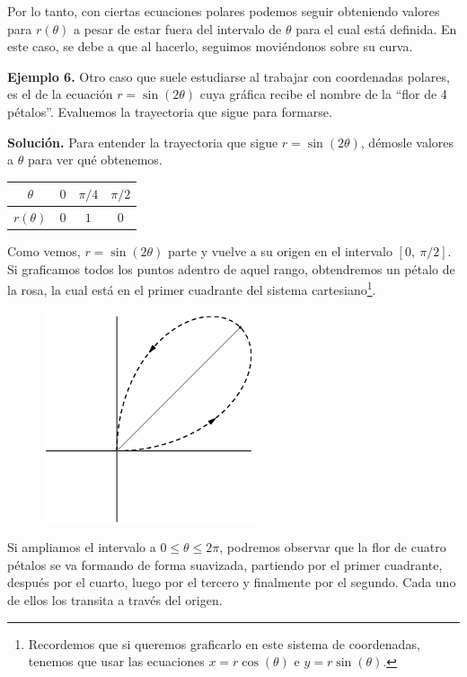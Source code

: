\documentclass[12pt]{article}
\begin{document}
Por lo tanto, con ciertas ecuaciones polares podemos seguir obteniendo valores para $r(\theta)$ a pesar de estar fuera del intervalo de $\theta$ para el cual está definida. En este caso, se debe a que al hacerlo, seguimos moviéndonos sobre su curva.

\textbf{Ejemplo 6.} Otro caso que suele estudiarse al trabajar con coordenadas polares, es el de la ecuación $r = \sin(2\theta)$ cuya gráfica recibe el nombre de la ``flor de 4 pétalos''. Evaluemos la trayectoria que sigue para formarse.

\textbf{Solución.} Para entender la trayectoria que sigue $r = \sin(2\theta)$, démosle valores a $\theta$ para ver qué obtenemos.

\begin{table}[hbt!]
\centering

\begin{tabular}{c|c c c}
$\theta$ & $0$ & $\pi/4$ & $\pi/2$ \\
\hline
$r(\theta)$ & $0$ & $1$ & $0$
\end{tabular}

\end{table}

Como vemos, $r = \sin(2\theta)$ parte y vuelve a su origen en el intervalo $[0, \ \pi/2]$. Si graficamos todos los puntos adentro de aquel rango, obtendremos un pétalo de la rosa, la cual está en el primer cuadrante del sistema cartesiano\footnote{Recordemos que si queremos graficarlo en este sistema de coordenadas, tenemos que usar las ecuaciones $x = r \cos(\theta)$ e $y = r \sin(\theta)$.}.

\begin{figure}[hbt!]
\centering
\includegraphics[scale=0.5]{03_un-petalo.jpg}
\end{figure}

Si ampliamos el intervalo a $0 \leq \theta \leq 2\pi$, podremos observar que la flor de cuatro pétalos se va formando de forma suavizada, partiendo por el primer cuadrante, después por el cuarto, luego por el tercero y finalmente por el segundo. Cada uno de ellos los transita a través del origen.
\end{document}
